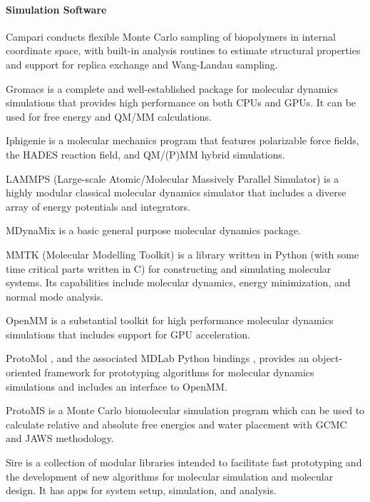 \paragraph{Simulation Software}

Campari \cite{Vitalis_2009} conducts flexible Monte Carlo sampling of biopolymers in internal coordinate space, with built-in analysis routines to estimate structural properties and support for replica exchange and Wang-Landau sampling.

Gromacs \cite{Pronk_2013} is a complete and well-established package for molecular dynamics simulations that provides high performance on both CPUs and GPUs.  It can be used for free energy and QM/MM calculations.

Iphigenie \cite{Lorenzen_2012} is a molecular mechanics program that features polarizable force fields, the HADES reaction field, and QM/(P)MM hybrid simulations.

LAMMPS  (Large-scale Atomic/Molecular Massively Parallel Simulator) \cite{Plimpton_1995} is a highly modular classical molecular dynamics simulator that includes a diverse array of energy potentials and integrators.

MDynaMix \cite{Lyubartsev_2000} is a basic general purpose molecular dynamics package.

MMTK (Molecular Modelling Toolkit) \cite{Hinsen_2000} is a library written in Python (with some time critical parts written in C) for constructing and simulating molecular systems.  Its capabilities include molecular dynamics, energy minimization, and normal mode analysis.

OpenMM  \cite{Eastman_2013} is a substantial toolkit for high performance molecular dynamics simulations that includes support for GPU acceleration.

ProtoMol \cite{Matthey_2004}, and the associated MDLab Python bindings \cite{Cickovski_2009}, provides an object-oriented framework for prototyping algorithms for molecular dynamics simulations and includes an interface to OpenMM.

ProtoMS \cite{Michel_2006} is a Monte Carlo biomolecular simulation program which can be used to calculate relative and absolute free energies and water placement with GCMC and JAWS methodology.

Sire is a collection of modular libraries intended to facilitate fast prototyping and the development of new algorithms for molecular simulation and molecular design. It has apps for system setup, simulation, and analysis.

